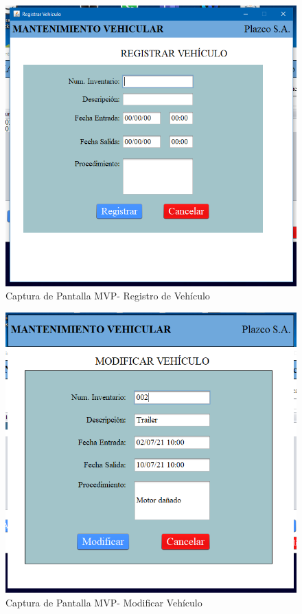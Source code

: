 \begin{figure}
	\centering
	\includegraphics[width=1\textwidth]{./apendice/imagenes/registro}
	\caption{Captura de Pantalla MVP- Registro de Vehículo}
	\label{fig:Captura de Pantalla MVP- Registro de Vehiculo}
\end{figure}

\begin{figure}
	\centering
	\includegraphics[width=1\textwidth]{./apendice/imagenes/modificar}
	\caption{Captura de Pantalla MVP- Modificar Vehículo}
	\label{fig:Captura de Pantalla MVP- Modificar Vehiculo}
\end{figure}

